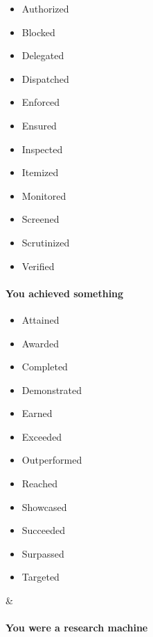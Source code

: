 \documentclass{article}
\begin{document}
\begin{longtable}
\begin{minipage}[t]{0.47\columnwidth}
\begin{itemize}
\item
  Authorized
\item
  Blocked
\item
  Delegated
\item
  Dispatched
\item
  Enforced
\item
  Ensured
\item
  Inspected
\item
  Itemized
\item
  Monitored
\item
  Screened
\item
  Scrutinized
\item
  Verified
\end{itemize}\strut
\end{minipage}\tabularnewline
\begin{minipage}[t]{0.47\columnwidth}\raggedright
\hypertarget{you-achieved-something}{%
\paragraph{You achieved something}\label{you-achieved-something}}

\begin{itemize}
\item
  Attained
\item
  Awarded
\item
  Completed
\item
  Demonstrated
\item
  Earned
\item
  Exceeded
\item
  Outperformed
\item
  Reached
\item
  Showcased
\item
  Succeeded
\item
  Surpassed
\item
  Targeted
\end{itemize}\strut
\end{minipage} & \begin{minipage}[t]{0.47\columnwidth}\raggedright
\hypertarget{you-were-a-research-machine}{%
\paragraph{You were a research
machine}\label{you-were-a-research-machine}}


\end{minipage}
\end{longtable}
\end{document}
